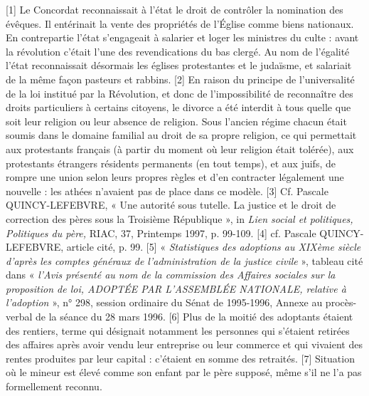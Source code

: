 [1] Le Concordat reconnaissait à l'état le droit de contrôler la nomination des évêques. Il entérinait la vente des propriétés de l'Église comme biens nationaux. En contrepartie l'état s'engageait à salarier et loger les ministres du culte : avant la révolution c'était l'une des revendications du bas clergé. Au nom de l'égalité l'état reconnaissait désormais les églises protestantes et le judaïsme, et salariait de la même façon pasteurs et rabbins.
[2] En raison du principe de l'universalité de la loi institué par la Révolution, et donc de l'impossibilité de reconnaître des droits particuliers à certains citoyens, le divorce a été interdit à tous quelle que soit leur religion ou leur absence de religion. Sous l'ancien régime chacun était soumis dans le domaine familial au droit de sa propre religion, ce qui permettait aux protestants français (à partir du moment où leur religion était tolérée), aux protestants étrangers résidents permanents (en tout temps), et aux juifs, de rompre une union selon leurs propres règles et d'en contracter légalement une nouvelle : les athées n'avaient pas de place dans ce modèle.
[3] Cf. Pascale QUINCY-LEFEBVRE, « Une autorité sous tutelle. La justice et le droit de correction des pères sous la Troisième République », in \emph{Lien social et politiques, Politiques du père,} RIAC, 37, Printemps 1997, p. 99-109.
[4] cf. Pascale QUINCY-LEFEBVRE, article cité, p. 99.
[5] « \emph{Statistiques des adoptions au XIXème siècle d'après les comptes généraux de l'administration de la justice civile} », tableau cité dans « \emph{l'Avis présenté au nom de la commission des Affaires sociales sur la proposition de loi, ADOPTÉE PAR L'ASSEMBLÉE NATIONALE, relative à l'adoption} », n° 298, session ordinaire du Sénat de 1995-1996, Annexe au procès-verbal de la séance du 28 mars 1996. 
[6] Plus de la moitié des adoptants étaient des rentiers, terme qui désignait notamment les personnes qui s'étaient retirées des affaires après avoir vendu leur entreprise ou leur commerce et qui vivaient des rentes produites par leur capital : c'étaient en somme des retraités.
[7] Situation où le mineur est élevé comme son enfant par le père supposé, même s'il ne l'a pas formellement reconnu.

